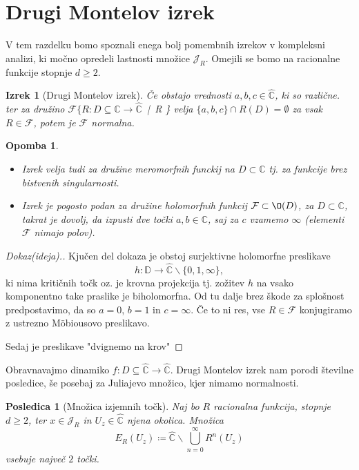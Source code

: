 \documentclass{article}
\newtheorem{posledica}{Posledica}
\newtheorem{opomba}{Opomba}
\newtheorem{izrek}{Izrek}
\newcommand{\C}{\mathbb{C}}
\newcommand{\D}{\mathbb{D}}
\newcommand{\F}{\mathcal{F}}
\begin{document}
\section{Drugi Montelov izrek}

V tem razdelku bomo spoznali enega bolj pomembnih izrekov v kompleksni analizi, 
ki močno opredeli lastnosti množice $\mathcal{J}_R$. Omejili se bomo 
na racionalne funkcije stopnje $d \geq 2$. 

\begin{izrek}[Drugi Montelov izrek]
Če obstajo vrednosti $a, b, c \in \hat{\C}$, ki so različne. ter za družino 
$\F \{R: D \subseteq \hat{\C} \rightarrow \hat{\C}$ \,|\, R \} 
velja $\{a, b, c\} \cap R(D) = \emptyset$ za vsak $R \in \F$, potem je 
$\F$ normalna. 
\end{izrek}

\begin{opomba}
\begin{itemize}
    \item Izrek velja tudi za družine meromorfnih funckij na $D \subset \C$ tj. 
    za funkcije brez bistvenih singularnosti.
    \item Izrek je pogosto podan za družine holomorfnih funkcij $\F \subset \O(D)$, 
    za $D \subset \C$, takrat je dovolj, da izpusti dve točki $a, b \in \C$, saj 
    za $c$ vzamemo $\infty$ (elementi $\F$ nimajo polov).
\end{itemize}
\end{opomba}

\begin{proof}[Dokaz(ideja).]
Kjučen del dokaza je obstoj surjektivne holomorfne preslikave 
$$
h: \D \rightarrow \hat{\C}\backslash \{0, 1, \infty\},
$$
ki nima kritičnih točk oz. je krovna projekcija tj. zožitev $h$ na vsako 
komponentno take praslike je biholomorfna. Od tu dalje brez škode za splošnost 
predpostavimo, da so $a = 0$, $b=1$ in $c = \infty$. Če to ni res, vse 
$R \in \F$ konjugiramo z ustrezno Möbiousovo preslikavo. 

Sedaj je preslikave "dvignemo na krov"
\end{proof}

Obravnavajmo dinamiko $f:D\subseteq \hat{\C} \rightarrow \hat{\C}$. 
Drugi Montelov izrek nam porodi številne posledice,  še posebaj 
za Juliajevo množico, kjer nimamo normalnosti.

\begin{posledica}[Množica izjemnih točk]
Naj bo $R$ racionalna funkcija, stopnje $d\geq 2$, ter $x\in \mathcal{J}_R$
in $U_z \in \hat{\C}$ njena okolica. Množica 
$$
E_R(U_z) \coloneqq \hat{\C} \backslash \bigcup_{n=0}^\infty R^n(U_z)
$$
vsebuje največ $2$ točki.
\end{posledica}
\end{document}
